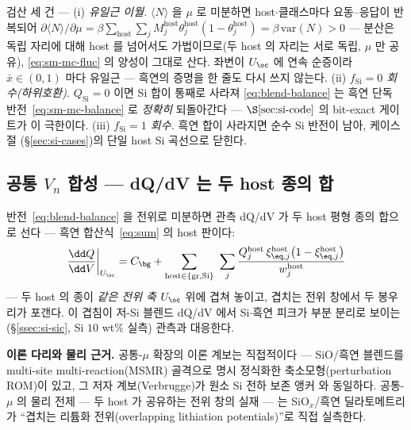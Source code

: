\begin{verifybox}
검산 세 건 --- (i) \emph{유일근 이월.} $\langle N\rangle$ 을 $\mu$ 로 미분하면 host$\cdot$클래스마다
요동--응답이 반복되어 $\partial\langle N\rangle/\partial\mu=\beta\sum_{\mathrm{host}}\sum_j M_j^{\mathrm{host}}\theta_j^{\mathrm{host}}(1-\theta_j^{\mathrm{host}})=\beta\,\mathrm{var}(N)>0$
--- 분산은 독립 자리에 대해 host 를 넘어서도 가법이므로(두 host 의 자리는 서로 독립, $\mu$ 만 공유),
\eqref{eq:sm-mc-fluc} 의 양성이 그대로 산다. 좌변이 $U_\oc$ 에 연속 순증이라 $\bar x\in(0,1)$ 마다
유일근 --- 흑연의 증명을 한 줄도 다시 쓰지 않는다. (ii) \emph{$f_\mathrm{Si}{=}0$ 회수(하위호환).}
$Q_\mathrm{Si}{=}0$ 이면 Si 합이 통째로 사라져 \eqref{eq:blend-balance} 는 흑연 단독
반전~\eqref{eq:sm-mc-balance} 로 \emph{정확히} 되돌아간다 --- $\S\ref{sec:si-code}$ 의 bit-exact 게이트가
이 극한이다. (iii) \emph{$f_\mathrm{Si}{=}1$ 회수.} 흑연 합이 사라지면 순수 Si 반전이 남아, 케이스 절
(\S\ref{sec:si-cases})의 단일 host Si 곡선으로 닫힌다.
\end{verifybox}

\subsection{공통 $V_n$ 합성 --- dQ/dV 는 두 host 종의 합}\label{ssec:blend-dqdv}
반전~\eqref{eq:blend-balance} 을 전위로 미분하면 관측 dQ/dV 가 두 host 평형 종의 합으로 선다 ---
흑연 합산식~\eqref{eq:sum} 의 host 판이다:
\begin{equation}
\frac{\dd Q}{\dd V}\bigg|_{U_\oc}=C_\bg+\sum_{\mathrm{host}\in\{\mathrm{gr},\mathrm{Si}\}}\ \sum_{j}
\frac{Q_j^{\mathrm{host}}\,\xi_{\eq,j}^{\mathrm{host}}\bigl(1-\xi_{\eq,j}^{\mathrm{host}}\bigr)}{w_j^{\mathrm{host}}}
\label{eq:blend-dqdv}
\end{equation}
--- 두 host 의 종이 \emph{같은 전위 축} $U_\oc$ 위에 겹쳐 놓이고, 겹치는 전위 창에서 두 봉우리가
포갠다. 이 겹침이 저-Si 블렌드 dQ/dV 에서 Si$\cdot$흑연 피크가 부분 분리로 보이는(\S\ref{ssec:si-sic},
Si $10$ wt\% 실측\cite{naboka_sic2021}) 관측과 대응한다.

\begin{srcbox}
\textbf{이론 다리와 물리 근거.} 공통-$\mu$ 확장의 이론 계보는 직접적이다 --- SiO/흑연 블렌드를
multi-site multi-reaction(MSMR) 골격으로 명시 정식화한 축소모형(perturbation ROM)이 있고, 그 저자
계보(Verbrugge)가 원소 Si 전하 보존 앵커\cite{verbrugge_lisi2016} 와 동일하다\cite{tu_blend2024}.
공통-$\mu$ 의 물리 전제 --- 두 host 가 공유하는 전위 창의 실재 --- 는 SiO$_x$/흑연 딜라토메트리가
``겹치는 리튬화 전위(overlapping lithiation potentials)''로 직접 실측한다\cite{zhan_siox2026}.
\end{srcbox}

